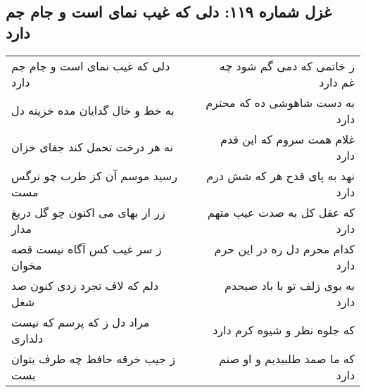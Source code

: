 \begin{center}
\section*{غزل شماره ۱۱۹: دلی که غیب نمای است و جام جم دارد}
\label{sec:sh119}
\begin{longtable}{l p{0.5cm} r}
دلی که غیب نمای است و جام جم دارد
&&
ز خاتمی که دمی گم شود چه غم دارد
\\
به خط و خال گدایان مده خزینه دل
&&
به دست شاهوشی ده که محترم دارد
\\
نه هر درخت تحمل کند جفای خزان
&&
غلام همت سروم که این قدم دارد
\\
رسید موسم آن کز طرب چو نرگس مست
&&
نهد به پای قدح هر که شش درم دارد
\\
زر از بهای می اکنون چو گل دریغ مدار
&&
که عقل کل به صدت عیب متهم دارد
\\
ز سر غیب کس آگاه نیست قصه مخوان
&&
کدام محرم دل ره در این حرم دارد
\\
دلم که لاف تجرد زدی کنون صد شغل
&&
به بوی زلف تو با باد صبحدم دارد
\\
مراد دل ز که پرسم که نیست دلداری
&&
که جلوه نظر و شیوه کرم دارد
\\
ز جیب خرقه حافظ چه طرف بتوان بست
&&
که ما صمد طلبیدیم و او صنم دارد
\\
\end{longtable}
\end{center}
